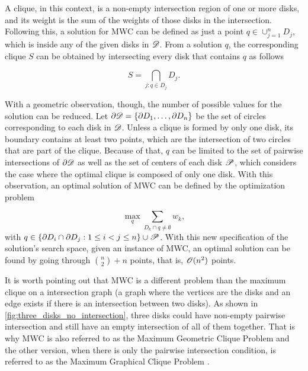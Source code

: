 A clique, in this context, is a non-empty intersection region of one or more disks, and its weight is the sum of the weights of those disks in the intersection.
Following this, a solution for MWC can be defined as just a point $q\in\cup_{j=1}^n D_j$, which is inside any of the given disks in $\mathscr{D}$.
From a solution $q$, the corresponding clique $S$ can be obtained by intersecting every disk that contains $q$ as follows

\begin{equation*}
S = \bigcap_{j : q \in D_j} D_j.
\end{equation*}

With a geometric observation, though, the number of possible values for the solution can be reduced.
Let $\partial \mathscr{D} = \{ \partial D_1, \dots, \partial D_n \}$ be the set of circles corresponding to each disk in $\mathscr{D}$. 
Unless a clique is formed by only one disk, its boundary contains at least two points, which are the intersection of two circles that are part of the clique.
Because of that, $q$ can be limited to the set of pairwise intersections of $\partial \mathscr{D}$ as well as the set of centers of each disk $\mathscr{P}$, which considers the case where the optimal clique is composed of only one disk. With this observation, an optimal solution of MWC can be defined by the optimization problem

\begin{equation*}
\max_{q} \sum_{D_k \cap q \neq \emptyset} w_k,
\end{equation*}
with $q \in \{\partial D_i \cap \partial D_j : 1 \le i < j \le n\} \cup \mathscr{P}$. With this new specification of the solution's search space, given an instance of MWC, an optimal solution can be found by going through $\binom{n}{2} + n$ points, that is, $\mathscr{O}(n^2)$ points.

It is worth pointing out that MWC is a different problem than the maximum clique on a intersection graph (a graph where the vertices are the disks and an edge exists if there is an intersection between two disks). 
As shown in \autoref{fig:three_disks_no_intersection}, three disks could have non-empty pairwise intersection and still have an empty intersection of all of them together.
That is why MWC is also referred to as the Maximum Geometric Clique Problem and the other version, when there is only the pairwise intersection condition, is referred to as the Maximum Graphical Clique Problem \cite{inplace:2014}. 


